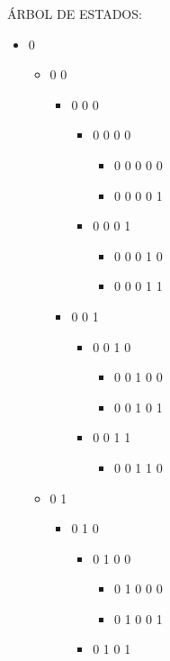 ÁRBOL DE ESTADOS:

\begin{itemize}
\item 0 


\begin{itemize}
\item 0 0 


\begin{itemize}
\item 0 0 0 


\begin{itemize}
\item 0 0 0 0 


\begin{itemize}
\item 0 0 0 0 0 
\item 0 0 0 0 1
\end{itemize}
\item 0 0 0 1 


\begin{itemize}
\item 0 0 0 1 0 
\item 0 0 0 1 1
\end{itemize}
\end{itemize}
\item 0 0 1 


\begin{itemize}
\item 0 0 1 0 


\begin{itemize}
\item 0 0 1 0 0 
\item 0 0 1 0 1
\end{itemize}
\item 0 0 1 1 


\begin{itemize}
\item 0 0 1 1 0
\end{itemize}
\end{itemize}
\end{itemize}
\item 0 1 


\begin{itemize}
\item 0 1 0 


\begin{itemize}
\item 0 1 0 0 


\begin{itemize}
\item 0 1 0 0 0 
\item 0 1 0 0 1
\end{itemize}
\item 0 1 0 1 



\end{itemize}
\end{itemize}
\end{itemize}
\end{itemize}
